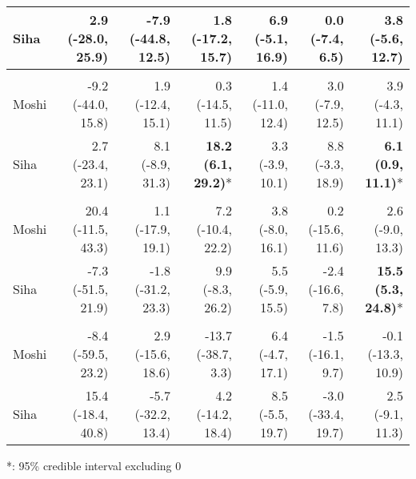 \begin{table}[t]
\begin{tabular*}{\linewidth}{@{\extracolsep{\fill}}l|rrrrrr}
Siha & 2.9 (-28.0, 25.9) & -7.9 (-44.8, 12.5) & 1.8 (-17.2, 15.7) & 6.9 (-5.1, 16.9) & 0.0 (-7.4, 6.5) & 3.8 (-5.6, 12.7) \\ 
\midrule\addlinespace[2.5pt]
\multicolumn{7}{l}{Urinary Tract Infections} \\[2.5pt] 
\midrule\addlinespace[2.5pt]
Moshi & -9.2 (-44.0, 15.8) & 1.9 (-12.4, 15.1) & 0.3 (-14.5, 11.5) & 1.4 (-11.0, 12.4) & 3.0 (-7.9, 12.5) & 3.9 (-4.3, 11.1) \\ 
Siha & 2.7 (-23.4, 23.1) & 8.1 (-8.9, 31.3) & \textbf{18.2 (6.1, 29.2)}* & 3.3 (-3.9, 10.1) & 8.8 (-3.3, 18.9) & \textbf{6.1 (0.9, 11.1)}* \\ 
\midrule\addlinespace[2.5pt]
\multicolumn{7}{l}{Malaria} \\[2.5pt] 
\midrule\addlinespace[2.5pt]
Moshi & 20.4 (-11.5, 43.3) & 1.1 (-17.9, 19.1) & 7.2 (-10.4, 22.2) & 3.8 (-8.0, 16.1) & 0.2 (-15.6, 11.6) & 2.6 (-9.0, 13.3) \\ 
Siha & -7.3 (-51.5, 21.9) & -1.8 (-31.2, 23.3) & 9.9 (-8.3, 26.2) & 5.5 (-5.9, 15.5) & -2.4 (-16.6, 7.8) & \textbf{15.5 (5.3, 24.8)}* \\ 
\midrule\addlinespace[2.5pt]
\multicolumn{7}{l}{Infectious Eye Disease} \\[2.5pt] 
\midrule\addlinespace[2.5pt]
Moshi & -8.4 (-59.5, 23.2) & 2.9 (-15.6, 18.6) & -13.7 (-38.7, 3.3) & 6.4 (-4.7, 17.1) & -1.5 (-16.1, 9.7) & -0.1 (-13.3, 10.9) \\ 
Siha & 15.4 (-18.4, 40.8) & -5.7 (-32.2, 13.4) & 4.2 (-14.2, 18.4) & 8.5 (-5.5, 19.7) & -3.0 (-33.4, 19.7) & 2.5 (-9.1, 11.3) \\ 
\bottomrule
\end{tabular*}
\begin{minipage}{\linewidth}
*: 95\% credible interval excluding 0\\
\end{minipage}
\end{table}

